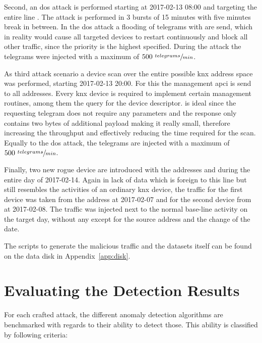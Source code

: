 Second, an \gls{dos} attack is performed starting at 2017-02-13 08:00 and targeting the entire line . The attack is performed in 3 bursts of 15 minutes with five minutes break in between. In the \gls{dos} attack a flooding of  telegrams with  are send, which in reality would cause all targeted devices to restart continuously and block all other traffic, since the  priority is the highest specified. During the attack the telegrams were injected with a maximum of \(500 \ \sfrac{telegrams}{min}\).

As third attack scenario a device scan over the entire possible \gls{knx} address space was performed, starting 2017-02-13 20:00.
For this the management \gls{apci}\break{} is send to all addresses. Every \gls{knx} device is required to implement certain management routines, among them the query for the device descriptor.  is ideal since the requesting telegram does not require any parameters and the response only contains two bytes of additional payload making it really small, therefore increasing the throughput and effectively reducing the time required for the scan. \parencite[cf.][p.~46]{DIN_EN_50090-4-1}
Equally to the \gls{dos} attack, the telegrams are injected with a maximum of \(500 \ \sfrac{telegrams}{min}\).

Finally, two new rogue device are introduced with the addresses  and  during the entire day of 2017-02-14.
Again in lack of data which is foreign to this line but still resembles the activities of an ordinary \gls{knx} device, the traffic for the first device was taken from the address  at 2017-02-07 and for the second device from  at 2017-02-08.
The traffic was injected next to the normal base-line activity on the target day, without any except for the source address and the change of the date.

The scripts to generate the malicious traffic and the datasets itself can be found on the data disk in Appendix~\ref{app:disk}.

\section{Evaluating the Detection Results}
\label{sec:methods:eval}

For each crafted attack, the different anomaly detection algorithms are benchmarked with regards to their ability to detect those.
This ability is classified by following criteria:

